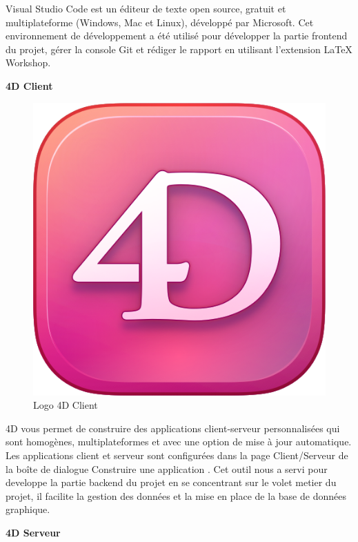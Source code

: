 Visual Studio Code est un éditeur de texte open source,
 gratuit et multiplateforme (Windows, Mac et Linux), 
 développé par Microsoft\cite{vsCode}. Cet environnement de développement 
 a été utilisé pour développer la partie frontend du projet, gérer la console Git et rédiger le rapport en utilisant l'extension LaTeX Workshop.
\newline

\large 
\textbf{4D Client}

\begin{figure}[htbp]
   \centering
   \includegraphics[scale=0.2]{Images/4dcl.png} 
   \caption{Logo 4D Client}
   \label{fig:4dcl}
\end{figure}

4D vous permet de construire des applications client-serveur 
personnalisées qui sont homogènes, multiplateformes et avec 
une option de mise à jour automatique. Les applications 
client et serveur sont configurées dans la page Client/Serveur 
de la boîte de dialogue Construire une application \cite{4d}.
Cet outil nous a servi pour developpe la partie backend du projet 
en se concentrant sur le volet metier du projet, il facilite la gestion
des données et la mise en place de la base de données graphique.
\newline

\large 
\textbf{4D Serveur}

